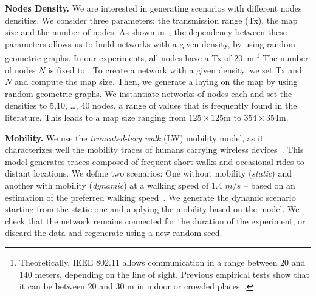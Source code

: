 \smallskip
\noindent
\textbf{Nodes Density.}
We are interested in generating scenarios with different nodes densities.
%
%
We consider three parameters: the transmission range (Tx), the map size and the number of nodes.
%
As shown in~\cite{Penrose2003}, the dependency between these parameters allows us to build networks with a given density, by using random geometric graphs.
%
In our experiments, all nodes have a Tx of 20~m.\footnote{Theoretically, IEEE 802.11 allows communication in a range between 20 and 140 meters, depending on the line of sight.
Previous empirical tests show that it can be between 20 and 30 m in indoor or crowded places~\cite{Garbinato2010}.}
The number of nodes $N$ is fixed to \nodesNumber{}. %
%
To create a network with a given density, we set Tx and $N$ and compute the map size.
%
Then, we generate a laying on the map by using random geometric graphs.
%
We instantiate \densitiesNumber{} networks of \nodesNumber{} nodes each and set the densities to  {5,10, \dots, 40} nodes, a range of values that is frequently found in the literature.
%
This leads to a map size ranging from $125 \times 125$m to $354 \times 354$m.

\smallskip
\noindent
\textbf{Mobility.}
We use the \emph{truncated-levy walk} (LW) mobility model, as it characterizes well the mobility traces of humans carrying wireless devices~\cite{Rhee:2011}.
%
This model generates traces composed of frequent short walks and occasional rides to distant locations.
%
We define two scenarios: One without mobility (\emph{static}) and another with mobility (\emph{dynamic}) at a walking speed of $1.4$ $m/s$ -- based on an estimation of the preferred walking speed~\cite{Browning390}.
%
We generate the dynamic scenario starting from the static one and applying the mobility based on the model.
We check that the network remains connected for the duration of the experiment, or discard the data and regenerate using a new random seed.

